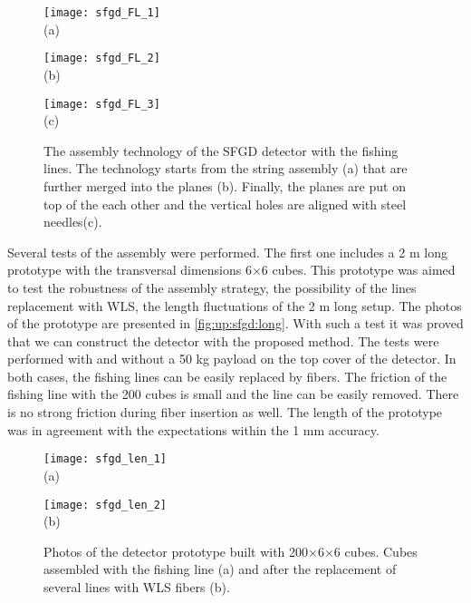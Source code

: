 \documentclass[main.tex]{subfiles}
\begin{document}
\begin{figure}[!ht]
	\centering
  \begin{minipage}{0.33\linewidth}
    \centering
    \texttt{[image: sfgd\_FL\_1]} \\ (a)
  \end{minipage}
  \begin{minipage}{0.33\linewidth}
    \centering
    \texttt{[image: sfgd\_FL\_2]} \\ (b)
  \end{minipage}
  \begin{minipage}{0.33\linewidth}
    \centering
    \texttt{[image: sfgd\_FL\_3]} \\ (c)
  \end{minipage}
  \caption{The assembly technology of the SFGD detector with the fishing lines. The technology starts from the string assembly (a) that are further merged into the planes (b). Finally, the planes are put on top of the each other and the vertical holes are aligned with steel needles(c).}
  \label{fig:up:sfgd:string}
\end{figure}

Several tests of the assembly were performed. The first one includes a 2 m long prototype with the transversal dimensions 6$\times$6 cubes. This prototype was aimed to test the robustness of the assembly strategy, the possibility of the lines replacement with WLS, the length fluctuations of the 2 m long setup. The photos of the prototype are presented in \autoref{fig:up:sfgd:long}. With such a test it was proved that we can construct the detector with the proposed method. The tests were performed with and without a 50 kg payload on the top cover of the detector. In both cases, the fishing lines can be easily replaced by fibers. The friction of the fishing line with the 200 cubes is small and the line can be easily removed. There is no strong friction during fiber insertion as well. The length of the prototype was in agreement with the expectations within the 1 mm accuracy.

\begin{figure}[!ht]
	\centering
  \begin{minipage}{0.49\linewidth}
    \centering
    \texttt{[image: sfgd\_len\_1]} \\ (a)
  \end{minipage}
  \begin{minipage}{0.49\linewidth}
    \centering
    \texttt{[image: sfgd\_len\_2]} \\ (b)
  \end{minipage}
  \caption{Photos of the detector prototype built with 200$\times$6$\times$6 cubes. Cubes assembled with the fishing line (a) and after the replacement of several lines with WLS fibers (b).}
  \label{fig:up:sfgd:long}
\end{figure}
\end{document}
